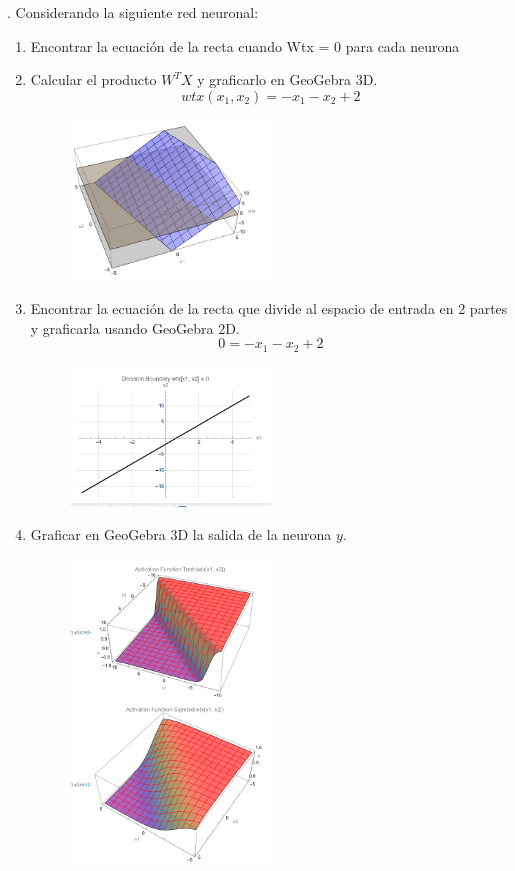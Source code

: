 \documentclass{article}
\begin{document}
\begin{flushleft}
. Considerando la siguiente red neuronal:
\begin{enumerate}
  \item
   Encontrar la ecuación de la recta cuando Wtx = 0 para cada neurona
  \item Calcular el producto $W^T X$ y graficarlo en GeoGebra 3D.
  \[ wtx(x_1, x_2) = - x_1 - x_2 + 2 \]
  \begin{figure}[H]
    \centering
    \includegraphics[width=0.5\textwidth]{Imagen0.png}  %
  \end{figure}
  \item Encontrar la ecuación de la recta que divide al espacio de entrada en 2 partes y graficarla usando GeoGebra 2D.
  \[ 0 = - x_1 - x_2 + 2 \]
  \begin{figure}[H]
    \centering
    \includegraphics[width=0.5\textwidth]{2_Decision_boundry.PNG}  %
  \end{figure}
  \item Graficar en GeoGebra 3D la salida de la neurona $y$.
  \begin{figure}[H]
    \centering
    \includegraphics[width=0.5\textwidth]{3_d.PNG}  %

\end{figure}
\end{enumerate}
\end{flushleft}
\end{document}
